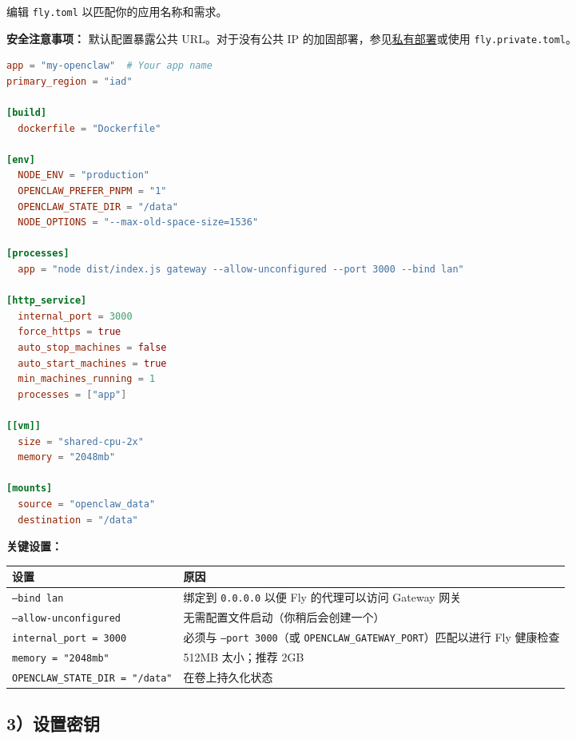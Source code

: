 编辑 \texttt{fly.toml} 以匹配你的应用名称和需求。

\textbf{安全注意事项：} 默认配置暴露公共 URL。对于没有公共 IP 的加固部署，参见\href{\#私有部署加固}{私有部署}或使用 \texttt{fly.private.toml}。

\begin{lstlisting}[language=toml]
app = "my-openclaw"  # Your app name
primary_region = "iad"

[build]
  dockerfile = "Dockerfile"

[env]
  NODE_ENV = "production"
  OPENCLAW_PREFER_PNPM = "1"
  OPENCLAW_STATE_DIR = "/data"
  NODE_OPTIONS = "--max-old-space-size=1536"

[processes]
  app = "node dist/index.js gateway --allow-unconfigured --port 3000 --bind lan"

[http_service]
  internal_port = 3000
  force_https = true
  auto_stop_machines = false
  auto_start_machines = true
  min_machines_running = 1
  processes = ["app"]

[[vm]]
  size = "shared-cpu-2x"
  memory = "2048mb"

[mounts]
  source = "openclaw_data"
  destination = "/data"
\end{lstlisting}


\textbf{关键设置：}


\begin{table}[h]
\centering
\small
\begin{tabular}{|l|l|}
\hline
设置 & 原因 \\
\hline
\texttt{--bind lan} & 绑定到 \texttt{0.0.0.0} 以便 Fly 的代理可以访问 Gateway 网关 \\
\hline
\texttt{--allow-unconfigured} & 无需配置文件启动（你稍后会创建一个） \\
\hline
\texttt{internal\_port = 3000} & 必须与 \texttt{--port 3000}（或 \texttt{OPENCLAW\_GATEWAY\_PORT}）匹配以进行 Fly 健康检查 \\
\hline
\texttt{memory = "2048mb"} & 512MB 太小；推荐 2GB \\
\hline
\texttt{OPENCLAW\_STATE\_DIR = "/data"} & 在卷上持久化状态 \\
\hline
\end{tabular}
\end{table}



\subsection{3）设置密钥}


